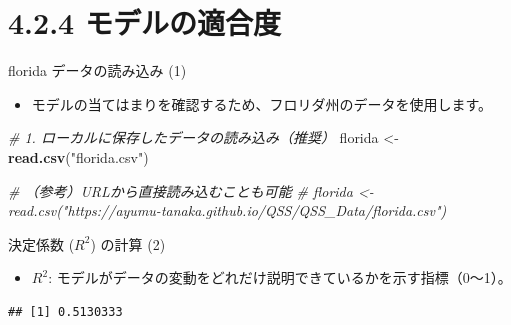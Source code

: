 \documentclass[
  ignorenonframetext,
]{beamer}
\newenvironment{Shaded}{\begin{snugshade}}{\end{snugshade}}
\newcommand{\AttributeTok}[1]{\textcolor[rgb]{0.13,0.29,0.53}{#1}}
\newcommand{\CommentTok}[1]{\textcolor[rgb]{0.56,0.35,0.01}{\textit{#1}}}
\newcommand{\FunctionTok}[1]{\textcolor[rgb]{0.13,0.29,0.53}{\textbf{#1}}}
\newcommand{\NormalTok}[1]{#1}
\newcommand{\OtherTok}[1]{\textcolor[rgb]{0.56,0.35,0.01}{#1}}
\newcommand{\SpecialCharTok}[1]{\textcolor[rgb]{0.81,0.36,0.00}{\textbf{#1}}}
\newcommand{\StringTok}[1]{\textcolor[rgb]{0.31,0.60,0.02}{#1}}
\providecommand{\tightlist}{%
  \setlength{\itemsep}{0pt}\setlength{\parskip}{0pt}}
\begin{document}
\section{4.2.4
モデルの適合度}\label{ux30e2ux30c7ux30ebux306eux9069ux5408ux5ea6}

\begin{frame}[fragile]{florida データの読み込み (1)}
\label{florida-ux30c7ux30fcux30bfux306eux8aadux307fux8fbcux307f-1}
\begin{itemize}
\tightlist
\item
  モデルの当てはまりを確認するため、フロリダ州のデータを使用します。
\end{itemize}

\scriptsize

\begin{Shaded}
\begin{Highlighting}[]
\CommentTok{\# 1. ローカルに保存したデータの読み込み（推奨）}
\NormalTok{florida }\OtherTok{\textless{}{-}} \FunctionTok{read.csv}\NormalTok{(}\StringTok{"florida.csv"}\NormalTok{)}

\CommentTok{\# （参考）URLから直接読み込むことも可能}
\CommentTok{\# florida \textless{}{-} read.csv("https://ayumu{-}tanaka.github.io/QSS/QSS\_Data/florida.csv")}
\end{Highlighting}
\end{Shaded}

\normalsize
\end{frame}

\begin{frame}[fragile]{決定係数 (\(R^2\)) の計算 (2)}
\label{ux6c7aux5b9aux4fc2ux6570-r2-ux306eux8a08ux7b97-2}
\begin{itemize}
\tightlist
\item
  \(R^2\):
  モデルがデータの変動をどれだけ説明できているかを示す指標（0〜1）。
\end{itemize}

\scriptsize

\begin{Shaded}
\end{Shaded}

\begin{verbatim}
## [1] 0.5130333
\end{verbatim}

\normalsize
\end{frame}
\end{document}
